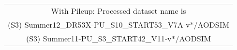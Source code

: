 \begin{table}[!ht]
\begin{center}
{\footnotesize
\begin{tabular}{l|l|c}
\hline
\multicolumn{3}{c}{With Pileup: Processed dataset name is} \\
\multicolumn{3}{c}{(S3) Summer12\_DR53X-PU\_S10\_START53\_V7A-v*/AODSIM} \\
\multicolumn{3}{c}{(S3) Summer11-PU\_S3\_START42\_V11-v*/AODSIM} \\
\hline

\end{tabular}}
\end{center}
\end{table}

